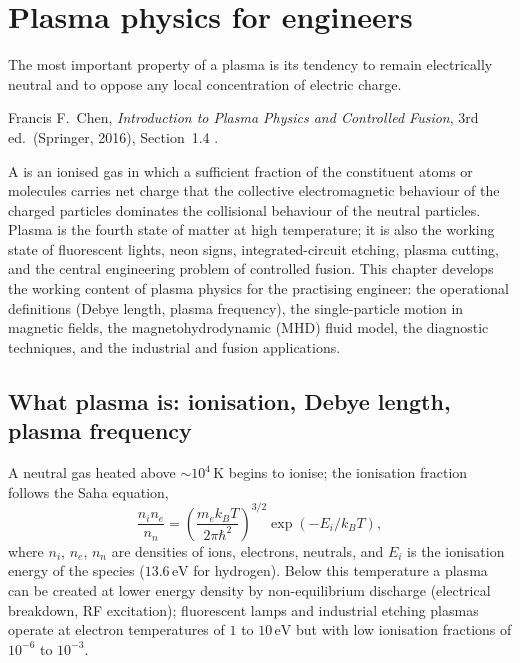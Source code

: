 \chapter{Plasma physics for engineers}
\label{vol04:ch13}

\epigraph{The most important property of a plasma is its tendency to
remain electrically neutral and to oppose any local concentration of
electric charge.}{Francis F.\ Chen, \emph{Introduction to Plasma
Physics and Controlled Fusion}, 3rd ed.\ (Springer, 2016), Section~1.4
\cite[Section~1.4]{text:chen-plasma-physics}.}


\noindent
A  is an ionised gas in which a sufficient fraction of
the constituent atoms or molecules carries net charge that the
collective electromagnetic behaviour of the charged particles
dominates the collisional behaviour of the neutral particles. Plasma
is the fourth state of matter at high temperature; it is also the
working state of fluorescent lights, neon signs, integrated-circuit
etching, plasma cutting, and the central engineering problem of
controlled fusion. This chapter develops the working content of
plasma physics for the practising engineer: the operational
definitions (Debye length, plasma frequency), the single-particle
motion in magnetic fields, the magnetohydrodynamic (MHD) fluid model,
the diagnostic techniques, and the industrial and fusion applications.

\section{What plasma is: ionisation, Debye length, plasma frequency}

A neutral gas heated above $\sim 10^{4}\,\si{\kelvin}$ begins to
ionise; the ionisation fraction follows the Saha equation,
\[
\frac{n_{i}n_{e}}{n_{n}} = \left(\frac{m_{e}k_{B}T}{2\pi\hbar^{2}}
\right)^{3/2}\exp(-E_{i}/k_{B}T),
\]
where $n_{i}$, $n_{e}$, $n_{n}$ are densities of ions, electrons,
neutrals, and $E_{i}$ is the ionisation energy of the species
($13.6\,\si{\electronvolt}$ for hydrogen). Below this temperature a
plasma can be created at lower energy density by non-equilibrium
discharge (electrical breakdown, RF excitation); fluorescent lamps
and industrial etching plasmas operate at electron temperatures of
$1$ to $10\,\si{\electronvolt}$ but with low ionisation fractions of
$10^{-6}$ to $10^{-3}$.

